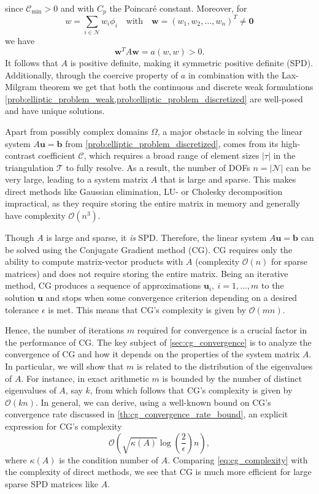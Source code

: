 since $\mathcal{C}_{\text{min}}>0$ and with $C_p$ the Poincaré constant. Moreover, for 
\[
    w = \sum_{i\in\mathcal{N}} w_i \phi_i \quad \text{with} \quad \mathbf{w} = (w_1, w_2, \ldots, w_n)^T \neq \mathbf{0}
\]
we have
\begin{equation*}
    \mathbf{w}^T A \mathbf{w} = a(w,w) > 0.
\end{equation*}
It follows that $A$ is positive definite, making it symmetric positive definite (SPD). Additionally, through the coercive property of $a$ in combination with the Lax-Milgram theorem we get that both the continuous and discrete weak formulations \cref{prob:elliptic_problem_weak,prob:elliptic_problem_discretized} are well-posed and have unique solutions.

Apart from possibly complex domains $\Omega$, a major obstacle in solving the linear system $A\mathbf{u} = \mathbf{b}$ from \cref{prob:elliptic_problem_discretized}, comes from its high-contrast coefficient $\mathcal{C}$, which requires a broad range of element sizes $|\tau|$ in the triangulation $\mathcal{T}$ to fully resolve. As a result, the number of DOFs $n = |\mathcal{N}|$ can be very large, leading to a system matrix $A$ that is large and sparse. This makes direct methods like Gaussian elimination, LU- or Cholesky decomposition impractical, as they require storing the entire matrix in memory and generally have complexity $\mathcal{O}(n^3)$.

Though $A$ is large and sparse, it \textit{is} SPD. Therefore, the linear system $A\mathbf{u} = \mathbf{b}$ can be solved using the Conjugate Gradient method (CG). CG requires only the ability to compute matrix-vector products with $A$ (complexity $\mathcal{O}(n)$ for sparse matrices) and does not require storing the entire matrix. Being an iterative method, CG produces a sequence of approximations $\mathbf{u}_i, \ i = 1,\dots,m$ to the solution $\mathbf{u}$ and stops when some convergence criterion depending on a desired tolerance $\epsilon$ is met. This means that CG's complexity is given by $\mathcal{O}(mn)$.

Hence, the number of iterations $m$ required for convergence is a crucial factor in the performance of CG. The key subject of \cref{sec:cg_convergence} is to analyze the convergence of CG and how it depends on the properties of the system matrix $A$. In particular, we will show that $m$ is related to the distribution of the eigenvalues of $A$. For instance, in exact arithmetic $m$ is bounded by the number of distinct eigenvalues of $A$, say $k$, from which follows that CG's complexity is given by $\mathcal{O}(kn)$. In general, we can derive, using a well-known bound on CG's convergence rate discussed in \cref{th:cg_convergence_rate_bound}, an explicit expression for CG's complexity
\begin{equation}
  \mathcal{O}\left(\sqrt{\kappa(A)}\log\left(\frac{2}{\epsilon}\right)n\right),
  \label{eq:cg_complexity}
\end{equation}
where $\kappa(A)$ is the condition number of $A$. Comparing \cref{eq:cg_complexity} with the complexity of direct methods, we see that CG is much more efficient for large sparse SPD matrices like $A$. 

